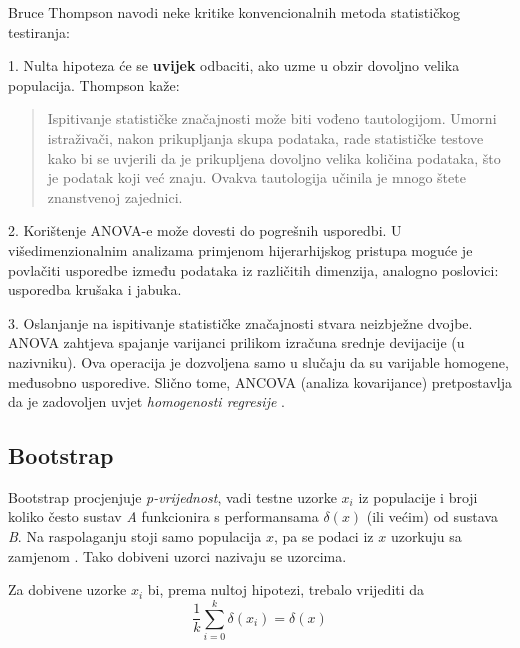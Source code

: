 Bruce Thompson \citep{thompson1993use} navodi neke kritike konvencionalnih metoda statističkog testiranja:

1. Nulta hipoteza će se \textbf{uvijek} odbaciti, ako uzme u obzir dovoljno velika populacija. Thompson kaže:
	
\begin{quote}
Ispitivanje statističke značajnosti može biti vođeno tautologijom. Umorni istraživači, nakon prikupljanja skupa podataka, rade statističke testove kako bi se uvjerili da je prikupljena dovoljno velika količina podataka, što je podatak koji već znaju. Ovakva tautologija učinila je mnogo štete znanstvenoj zajednici.
\end{quote}

2. Korištenje ANOVA-e može dovesti do pogrešnih usporedbi. U višedimenzionalnim analizama primjenom hijerarhijskog pristupa moguće je povlačiti usporedbe između podataka iz različitih dimenzija, analogno poslovici: usporedba krušaka i jabuka. 

3. Oslanjanje na ispitivanje statističke značajnosti stvara neizbježne dvojbe. \\  ANOVA zahtjeva spajanje varijanci prilikom izračuna srednje devijacije (u nazivniku). Ova operacija je dozvoljena samo u slučaju da su varijable homogene, međusobno usporedive. Slično tome, ANCOVA (analiza kovarijance) pretpostavlja da je zadovoljen uvjet \textit{homogenosti regresije} . 




\subsection{Bootstrap}

Bootstrap procjenjuje \textit{p-vrijednost}, vadi testne uzorke $x_i$ iz populacije i broji koliko često sustav \emph{A} funkcionira s performansama $\delta(x)$ (ili većim) od sustava \textit{B}. Na raspolaganju stoji samo populacija $x$, pa se podaci iz $x$ uzorkuju sa zamjenom . Tako dobiveni uzorci nazivaju se  uzorcima. 

Za dobivene uzorke $x_i$ bi, prema nultoj hipotezi, trebalo vrijediti da 
\begin{equation}
\label{eq:jednakost_delta}
\frac{1}{k}\sum_{i=0}^{k}\delta(x_i) = \delta(x)
\end{equation}

